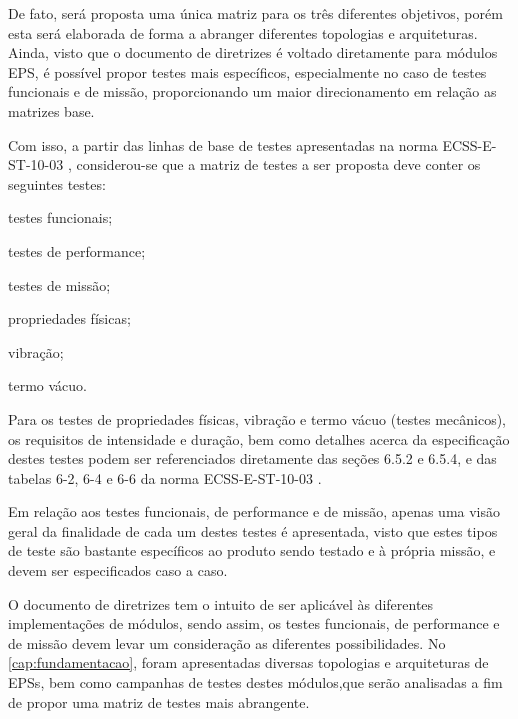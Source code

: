 De fato, será proposta uma única matriz para os três diferentes objetivos, porém esta será elaborada de forma a abranger diferentes topologias e arquiteturas.
Ainda, visto que o documento de diretrizes é voltado diretamente para módulos \gls{EPS}, é possível propor testes mais específicos, especialmente no caso de testes funcionais e de missão, proporcionando um maior direcionamento em relação as matrizes base.


Com isso, a partir das linhas de base de testes apresentadas na norma ECSS-E-ST-10-03 \cite{ecss-e-st-10-03}, considerou-se que a matriz de testes a ser proposta deve conter os seguintes testes:

\begin{alineas}
    \item testes funcionais;
    \item testes de performance;
    \item testes de missão;
    \item propriedades físicas;
    \item vibração;
    \item termo vácuo.
\end{alineas}




Para os testes de propriedades físicas, vibração e termo vácuo (testes mecânicos), os requisitos de intensidade e duração, bem como detalhes acerca da especificação destes testes podem ser referenciados diretamente das seções 6.5.2 e 6.5.4, e das tabelas 6-2, 6-4 e 6-6 da norma ECSS-E-ST-10-03 \cite{ecss-e-st-10-03}.

Em relação aos testes funcionais, de performance e de missão, apenas uma visão geral da finalidade de cada um destes testes é apresentada, visto que estes tipos de teste são bastante específicos ao produto sendo testado e à própria missão, e devem ser especificados caso a caso.

O documento de diretrizes tem o intuito de ser aplicável às diferentes implementações de módulos, sendo assim, os testes funcionais, de performance e de missão devem levar um consideração as diferentes possibilidades.
No \autoref{cap:fundamentacao}, foram apresentadas diversas topologias e arquiteturas de \gls{EPS}s, bem como campanhas de testes destes módulos,que serão analisadas a fim de propor uma matriz de testes mais abrangente.


